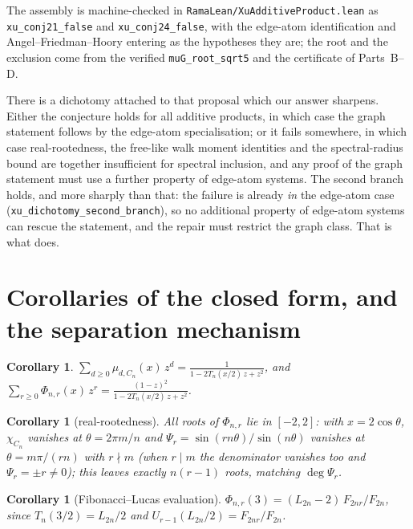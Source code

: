 \documentclass[11pt]{article}
\newtheorem{corollary}[theorem]{Corollary}
\theoremstyle{remark}
\begin{document}
The assembly is machine-checked in \texttt{RamaLean/XuAdditiveProduct.lean} as
\texttt{xu\_conj21\_false} and \texttt{xu\_conj24\_false}, with the edge-atom identification and
Angel--Friedman--Hoory entering as the hypotheses they are; the root and the exclusion come from
the verified \texttt{muG\_root\_sqrt5} and the certificate of Parts~B--D.

There is a dichotomy attached to that proposal which our answer sharpens. Either the conjecture
holds for all additive products, in which case the graph statement follows by the edge-atom
specialisation; or it fails somewhere, in which case real-rootedness, the free-like walk moment
identities and the spectral-radius bound are together insufficient for spectral inclusion, and
any proof of the graph statement must use a further property of edge-atom systems. The second
branch holds, and more sharply than that: the failure is already \emph{in} the edge-atom case
(\texttt{xu\_dichotomy\_second\_branch}), so no additional property of edge-atom systems can
rescue the statement, and the repair must restrict the graph class. That is what
\cite{PartI} does.



\section{Corollaries of the closed form, and the separation mechanism}

\begin{corollary}\label{cor:gf}
$\displaystyle\sum_{d\ge 0}\mu_{d,C_n}(x)\,z^d=\frac{1}{1-2T_n(x/2)\,z+z^2}$,
\quad and \quad
$\displaystyle\sum_{r\ge 0}\Phi_{n,r}(x)\,z^r=\frac{(1-z)^2}{1-2T_n(x/2)\,z+z^2}$.
\end{corollary}

\begin{corollary}[real-rootedness]\label{cor:roots}
All roots of $\Phi_{n,r}$ lie in $[-2,2]$: with $x=2\cos\theta$,
$\chi_{C_n}$ vanishes at $\theta=2\pi m/n$ and
$\Psi_r=\sin(rn\theta)/\sin(n\theta)$ vanishes at $\theta=m\pi/(rn)$ with $r\nmid m$
(when $r\mid m$ the denominator vanishes too and $\Psi_r=\pm r\neq0$); this leaves
exactly $n(r-1)$ roots, matching $\deg\Psi_r$.
\end{corollary}

\begin{corollary}[Fibonacci--Lucas evaluation]\label{cor:fib}
$\Phi_{n,r}(3)=(L_{2n}-2)\,F_{2nr}/F_{2n}$, since $T_n(3/2)=L_{2n}/2$ and
$U_{r-1}(L_{2n}/2)=F_{2nr}/F_{2n}$.
\end{corollary}
\end{document}
